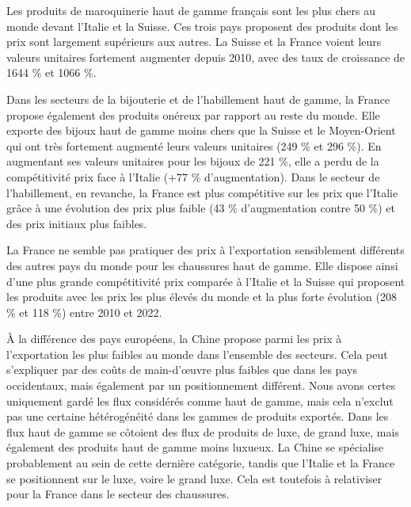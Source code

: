\documentclass[french,10pt,a4paper]{article}
\begin{document}
Les produits de maroquinerie haut de gamme français sont les plus chers au monde devant l'Italie et la Suisse. Ces trois pays proposent des produits dont les prix sont largement supérieurs aux autres. La Suisse et la France voient leurs valeurs unitaires fortement augmenter depuis 2010, avec des taux de croissance de 1644 \% et 1066 \%. 

Dans les secteurs de la bijouterie et de l'habillement haut de gamme, la France propose également des produits onéreux par rapport au reste du monde. Elle exporte des bijoux haut de gamme moins chers que la Suisse et le Moyen-Orient qui ont très fortement augmenté leurs valeurs unitaires (249 \% et 296 \%). En augmentant ses valeurs unitaires pour les bijoux de 221 \%, elle a perdu de la compétitivité prix face à l'Italie (+77 \% d'augmentation). Dans le secteur de l'habillement, en revanche, la France est plus compétitive sur les prix que l'Italie grâce à une évolution des prix plus faible (43 \% d'augmentation contre 50 \%) et des prix initiaux plus faibles. 

La France ne semble pas pratiquer des prix à l'exportation sensiblement différents des autres pays du monde pour les chaussures haut de gamme. Elle dispose ainsi d'une plus grande compétitivité prix comparée à l'Italie et la Suisse qui proposent les produits avec les prix les plus élevés du monde et la plus forte évolution (208 \% et 118 \%) entre 2010 et 2022. 

À la différence des pays européens, la Chine propose parmi les prix à l'exportation les plus faibles au monde dans l'ensemble des secteurs. Cela peut s'expliquer par des coûts de main-d'œuvre plus faibles que dans les pays occidentaux, mais également par un positionnement différent. Nous avons certes uniquement gardé les flux considérés comme haut de gamme, mais cela n'exclut pas une certaine hétérogénéité dans les gammes de produits exportés. Dans les flux haut de gamme se côtoient des flux de produits de luxe, de grand luxe, mais également des produits haut de gamme moins luxueux. La Chine se spécialise probablement au sein de cette dernière catégorie, tandis que l'Italie et la France se positionnent sur le luxe, voire le grand luxe. Cela est toutefois à relativiser pour la France dans le secteur des chaussures.

\bigskip
\end{document}
